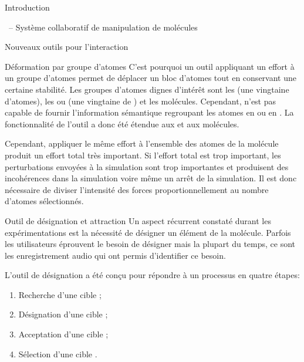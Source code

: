 \documentclass[myfrancais]{mythesis}
\begin{document}
\begin{mypart}{Introduction}
\begin{mychapter}{\myShaddock\ -- Système collaboratif de manipulation de molécules}
\begin{mysection}{Nouveaux outils pour l'interaction}
\begin{mysubsection}{Déformation par groupe d'atomes}
					C'est pourquoi un outil appliquant un effort à un groupe d'atomes permet de déplacer un bloc d'atomes tout en conservant une certaine stabilité.
					Les groupes d'atomes dignes d'intérêt sont les  (une vingtaine d'atomes), les \myhelice* ou \myfeuillet* (une vingtaine de ) et les molécules.
					Cependant,  n'est pas capable de fournir l'information sémantique regroupant les atomes en \myhelice* ou en \myfeuillet*.
					La fonctionnalité de l'outil  a donc été étendue aux  et aux molécules.

					Cependant, appliquer le même effort à l'ensemble des atomes de la molécule produit un effort total très important.
					Si l'effort total est trop important, les perturbations envoyées à la simulation sont trop importantes et produisent des incohérences dans la simulation voire même un arrêt de la simulation.
					Il est donc nécessaire de diviser l'intensité des forces proportionnellement au nombre d'atomes sélectionnés.
				\end{mysubsection}
				\begin{mysubsection}{Outil de désignation et attraction}
					Un aspect récurrent constaté durant les expérimentations est la nécessité de désigner un élément de la molécule.
					Parfois les utilisateurs éprouvent le besoin de désigner mais la plupart du temps, ce sont les enregistrement audio qui ont permis d'identifier ce besoin.

					L'outil de désignation a été conçu pour répondre à un processus en quatre étapes:
					\begin{enumerate}[label={\alph*.},ref={\alph*}]
						\item Recherche d'une cible ;\label{enu-designation-RechercheDUneCible}
						\item Désignation d'une cible ;\label{enu-designation-DesignationDUneCible}
						\item Acceptation d'une cible ;\label{enu-designation-AcceptationDUneCible}
						\item Sélection d'une cible .\label{enu-designation-SelectionDUneCible}
					\end{enumerate}


\end{mysubsection}
\end{mysection}
\end{mychapter}
\end{mypart}
\end{document}
